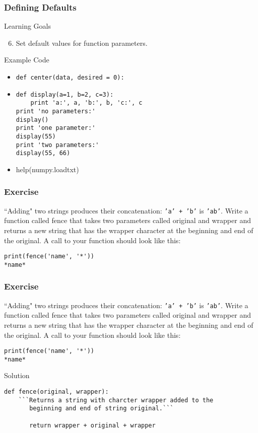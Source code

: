 \documentclass{beamer}
\begin{document}
\begin{frame}[fragile]
\frametitle{Defining Defaults}
\begin{block}{Learning Goals}
\begin{enumerate}
\setcounter{enumi}{5}
\item Set default values for function parameters.
\end{enumerate}
\end{block}
\begin{block}{Example Code}
\begin{itemize}
\item 
\begin{verbatim}
def center(data, desired = 0):
\end{verbatim}
\item
\begin{verbatim}
def display(a=1, b=2, c=3):
    print 'a:', a, 'b:', b, 'c:', c
print 'no parameters:'
display()
print 'one parameter:'
display(55)
print 'two parameters:'
display(55, 66)
\end{verbatim}
\item help(numpy.loadtxt)
\end{itemize}
\end{block}
\end{frame}

\begin{frame}[fragile]
\frametitle{Exercise}

``Adding" two strings produces their concatenation: \texttt{'a' + 'b'} is \texttt{'ab'}. Write a function called fence that takes two parameters called original and wrapper and returns a new string that has the wrapper character at the beginning and end of the original. A call to your function should look like this:
\begin{verbatim}
print(fence('name', '*'))
*name*
\end{verbatim}
\end{frame}

\begin{frame}[fragile]
\frametitle{Exercise}

``Adding" two strings produces their concatenation: \texttt{'a' + 'b'} is \texttt{'ab'}. Write a function called fence that takes two parameters called original and wrapper and returns a new string that has the wrapper character at the beginning and end of the original. A call to your function should look like this:
\begin{verbatim}
print(fence('name', '*'))
*name*
\end{verbatim}

\begin{block}{Solution}
\begin{verbatim}
def fence(original, wrapper):
    ```Returns a string with charcter wrapper added to the 
       beginning and end of string original.```
       
       return wrapper + original + wrapper
\end{verbatim}
\end{block}
\end{frame}
\end{document}
